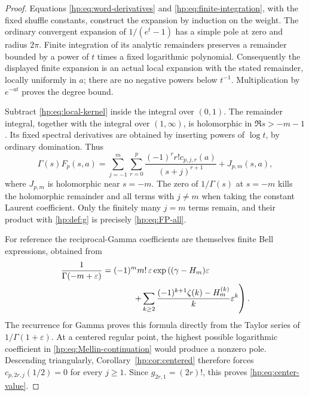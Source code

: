\documentclass[11pt,a4paper]{article}
\numberwithin{equation}{section}
\theoremstyle{definition}
\theoremstyle{remark}
\begin{document}
\begin{proof}
Equations \eqref{hp:eq:word-derivatives} and
\eqref{hp:eq:finite-integration}, with the fixed shuffle constants,
construct the expansion by induction on the weight. The ordinary
convergent expansion of $1/(e^t-1)$ has a simple pole at zero and
radius $2\pi$. Finite integration of its analytic remainders preserves
a remainder bounded by a power of $t$ times a fixed logarithmic
polynomial. Consequently the displayed finite expansion is an actual
local expansion with the stated remainder, locally uniformly in $a$;
there are no negative powers below $t^{-1}$. Multiplication by
$e^{-at}$ proves the degree bound.

Subtract \eqref{hp:eq:local-kernel} inside the integral over $(0,1)$.
The remainder integral, together with the integral over $(1,\infty)$,
is holomorphic in $\Re s>-m-1$. Its fixed spectral derivatives are
obtained by inserting powers of $\log t$, by ordinary domination.
Thus
\begin{equation}\label{hp:eq:Mellin-continuation}
 \Gamma(s)F_p(s,a)=
 \sum_{j=-1}^{m}\sum_{r=0}^p
       \frac{(-1)^rr!c_{p,j,r}(a)}{(s+j)^{r+1}}+J_{p,m}(s,a),
\end{equation}
where $J_{p,m}$ is holomorphic near $s=-m$.
The zero of $1/\Gamma(s)$ at $s=-m$ kills the holomorphic remainder
and all terms with $j\ne m$ when taking the constant Laurent
coefficient. Only the finitely many $j=m$ terms remain, and their
product with \eqref{hp:def:g} is precisely \eqref{hp:eq:FP-all}.

For reference the reciprocal-Gamma coefficients are themselves finite
Bell expressions, obtained from
\begin{align}\label{hp:eq:gamma-generator}
 \frac1{\Gamma(-m+\varepsilon)}
 ={}&(-1)^m m!\,\varepsilon
 \exp\left((\gamma-H_m)\varepsilon\right.\notag\\
 &\left.\hspace{8mm}+
 \sum_{k\ge2}\frac{(-1)^{k+1}\zeta(k)-H_m^{(k)}}k
                                      \varepsilon^k\right).
\end{align}
The recurrence for Gamma proves this formula directly from the Taylor
series of $1/\Gamma(1+\varepsilon)$.
At a centered regular point, the highest possible logarithmic
coefficient in \eqref{hp:eq:Mellin-continuation} would produce a
nonzero pole. Descending triangularly, Corollary~\ref{hp:cor:centered}
therefore forces $c_{p,2r,j}(1/2)=0$ for every $j\ge1$. Since
$g_{2r,1}=(2r)!$, this proves \eqref{hp:eq:center-value}.
\end{proof}
\end{document}

